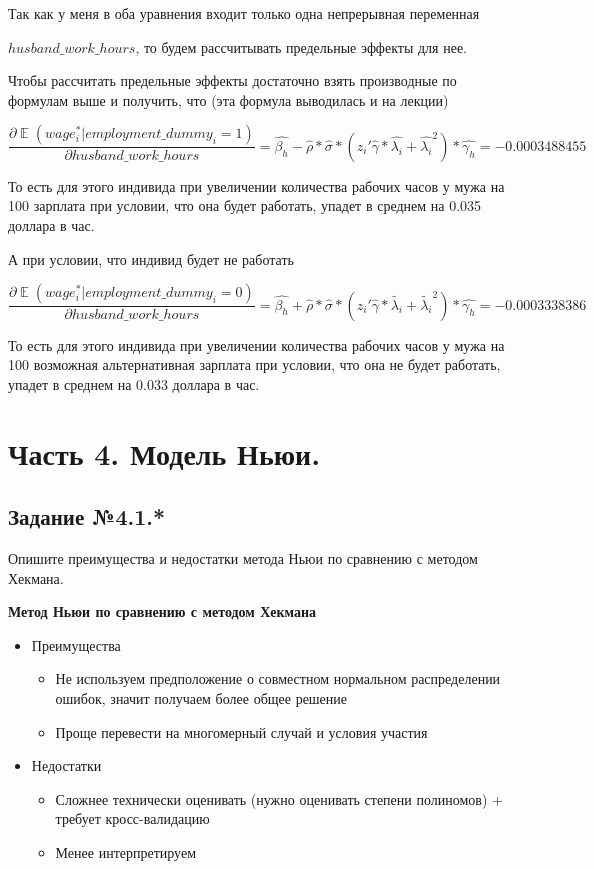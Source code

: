 \documentclass[a4paper,12pt]{article}
\DeclareMathOperator{\EX}{\mathbb{E}}%
\begin{document}
\begin{enumerate}[label=\Alph*)]
 	Так как у меня в оба уравнения входит только одна непрерывная переменная 
 	
 	 $husband\_work\_hours$, то будем рассчитывать предельные эффекты для нее.
 	
 	Чтобы рассчитать предельные эффекты достаточно взять производные по формулам выше и получить, что (эта формула выводилась и на лекции)
 	
 	$\dfrac{\partial \EX(wage_i^*|employment\_dummy_i = 1) }{\partial husband\_work\_hours}=
 	\hat{\beta_h}-\hat{\rho}*\hat{\sigma}*(z_i'\hat{\gamma}*\hat{\lambda_i}+\hat{\lambda_i}^2)*\hat{\gamma_h} = -0.0003488455$

	То есть для этого индивида при увеличении количества рабочих часов у мужа на 100 зарплата при условии, что она будет работать, упадет в среднем на 0.035 доллара в час.
	
	А при условии, что индивид будет не работать
	 
	 $\dfrac{\partial \EX(wage_i^*|employment\_dummy_i = 0) }{\partial husband\_work\_hours}=
	\hat{\beta_h}+\hat{\rho}*\hat{\sigma}*(z_i'\hat{\gamma}*\tilde{\lambda_i}+\tilde{\lambda_i}^2)*\hat{\gamma_h} = -0.0003338386$
	
	То есть для этого индивида при увеличении количества рабочих часов у мужа на 100 возможная альтернативная зарплата при условии, что она не будет работать, упадет в среднем на 0.033 доллара в час.
	
\end{enumerate}
 

\section{Часть 4. Модель Ньюи.}

\subsection{Задание №4.1.*} Опишите преимущества и недостатки метода Ньюи по сравнению с методом Хекмана.

\vspace{0.2cm}

\textbf{Метод Ньюи по сравнению с методом Хекмана}

\begin{itemize}
	\item Преимущества
	\begin{itemize}
		\item Не используем предположение о совместном нормальном распределении ошибок, значит получаем более общее решение
		\item Проще перевести на многомерный случай и условия участия
	\end{itemize}
	
	\item Недостатки
	\begin{itemize}
		\item Сложнее технически оценивать (нужно оценивать степени полиномов) + требует кросс-валидацию 
		\item Менее интерпретируем
	\end{itemize}
\end{itemize}
\end{document}
